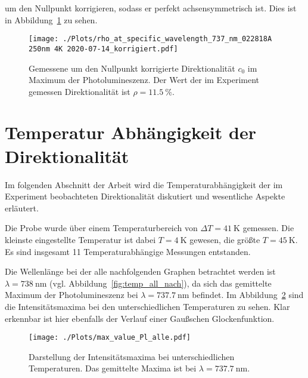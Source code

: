 um den Nullpunkt korrigieren, sodass er perfekt achsensymmetrisch ist.
Dies ist in Abbildung~\ref{fig:dir_kor} zu sehen.
\begin{figure}
    \centering
    \texttt{[image: ./Plots/rho\_at\_specific\_wavelength\_737\_nm\_022818A 250nm 4K 2020-07-14\_korrigiert.pdf]}
    \caption{Gemessene um den Nullpunkt korrigierte Direktionalität $c_0$ im Maximum der Photolumineszenz.
    Der Wert der im Experiment gemessen Direktionalität ist $\rho = \SI{11,5}{\percent}$.}
    \label{fig:dir_kor}
\end{figure}
\FloatBarrier


\section{Temperatur Abhängigkeit der Direktionalität}
Im folgenden Abschnitt der Arbeit wird die Temperaturabhängigkeit der im Experiment
beobachteten Direktionalität diskutiert und wesentliche Aspekte erläutert.

Die Probe wurde über einem Temperaturbereich von $ \Delta T =\SI{41}{\kelvin} $ gemessen.
Die kleinste eingestellte Temperatur ist dabei $T =\SI{4}{\kelvin}$ gewesen, die größte 
$T =\SI{45}{\kelvin}$.
Es sind insgesamt 11 Temperaturabhängige Messungen entstanden.

Die Wellenlänge bei der alle nachfolgenden Graphen betrachtet werden ist $\lambda =\SI{738}{\nano\meter}$ 
(vgl. Abbildung~\ref{fig:temp_all_nach}), da sich das gemittelte Maximum der Photolumineszenz bei
$\lambda =\SI{737,7}{\nano\meter}$ befindet.
Im Abbildung~\ref{fig:int_temp} sind die Intensitätsmaxima bei den unterschiedlichen Temperaturen zu sehen.
Klar erkennbar ist hier ebenfalls der Verlauf einer Gaußschen Glockenfunktion.
\begin{figure}
    \centering
    \texttt{[image: ./Plots/max\_value\_Pl\_alle.pdf]}
    \caption{Darstellung der Intensitätsmaxima bei unterschiedlichen Temperaturen.
    Das gemittelte Maxima ist bei $\lambda =\SI{737,7}{\nano\meter}$.}
    \label{fig:int_temp}
\end{figure}
\FloatBarrier 

